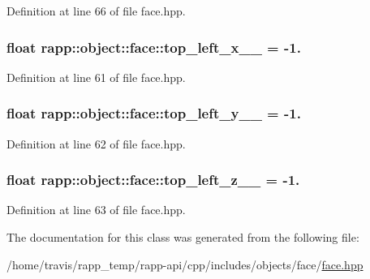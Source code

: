 Definition at line 66 of file face.\-hpp.

\hypertarget{classrapp_1_1object_1_1face_a9d04cd084b62af674516aa71b8c8a142}{
\subsubsection[{top\-\_\-left\-\_\-x\-\_\-\-\_\-}]{\setlength{\rightskip}{0pt plus 5cm}float rapp\-::object\-::face\-::top\-\_\-left\-\_\-x\-\_\-\-\_\- = -\/1.\hspace{0.3cm}{\ttfamily [private]}}}\label{classrapp_1_1object_1_1face_a9d04cd084b62af674516aa71b8c8a142}


Definition at line 61 of file face.\-hpp.

\hypertarget{classrapp_1_1object_1_1face_a49bd8f68f0c9a4a6dd14c315edc72d50}{
\subsubsection[{top\-\_\-left\-\_\-y\-\_\-\-\_\-}]{\setlength{\rightskip}{0pt plus 5cm}float rapp\-::object\-::face\-::top\-\_\-left\-\_\-y\-\_\-\-\_\- = -\/1.\hspace{0.3cm}{\ttfamily [private]}}}\label{classrapp_1_1object_1_1face_a49bd8f68f0c9a4a6dd14c315edc72d50}


Definition at line 62 of file face.\-hpp.

\hypertarget{classrapp_1_1object_1_1face_ac11e89d2ed6a03ba5112a5a2ba308c56}{
\subsubsection[{top\-\_\-left\-\_\-z\-\_\-\-\_\-}]{\setlength{\rightskip}{0pt plus 5cm}float rapp\-::object\-::face\-::top\-\_\-left\-\_\-z\-\_\-\-\_\- = -\/1.\hspace{0.3cm}{\ttfamily [private]}}}\label{classrapp_1_1object_1_1face_ac11e89d2ed6a03ba5112a5a2ba308c56}


Definition at line 63 of file face.\-hpp.



The documentation for this class was generated from the following file\-:\begin{DoxyCompactItemize}
\item 
/home/travis/rapp\-\_\-temp/rapp-\/api/cpp/includes/objects/face/\hyperlink{face_8hpp}{face.\-hpp}\end{DoxyCompactItemize}
